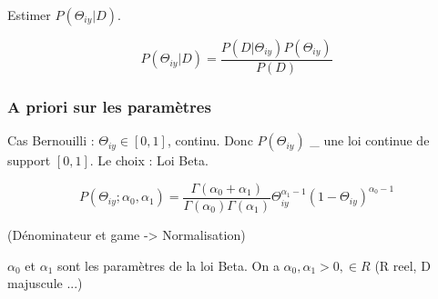 \documentclass{article}
\begin{document}
Estimer $ P(\Theta_{iy} | D) $.

\[ P(\Theta_{iy} | D) = \frac{P(D | \Theta_{iy})P(\Theta_{iy})}{P(D)} \]

\subsubsection{A priori sur les paramètres}

Cas Bernouilli : $\Theta_{iy} \in [0, 1]$, continu. Donc $P(\Theta_{iy})$ \_ une loi continue de support $[0, 1]$.
Le choix : Loi Beta.

\[ P(\Theta_{iy}; \alpha_0, \alpha_1) = \frac{\Gamma (\alpha_0 + \alpha_1)}{\Gamma (\alpha_0) \Gamma (\alpha_1)} \Theta_{iy}^{\alpha_1 - 1} (1 - \Theta_{iy})^{\alpha_0 - 1} \]

(Dénominateur et game -> Normalisation)

$\alpha_0$ et $\alpha_1$ sont les paramètres de la loi Beta. On a $\alpha_0, \alpha_1 > 0, \in R$ (R reel, D majuscule ...)
\end{document}
